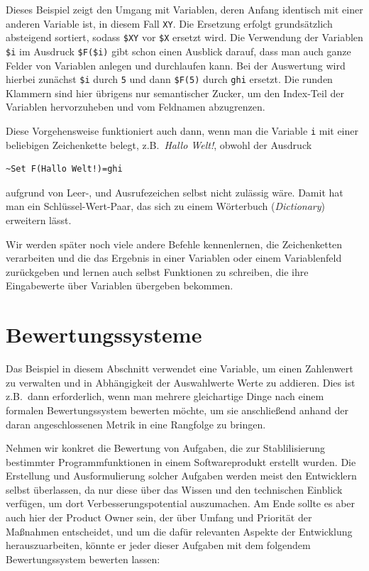 Dieses Beispiel zeigt den Umgang mit Variablen, deren Anfang identisch mit einer anderen Variable ist, in diesem Fall \verb|XY|. Die Ersetzung erfolgt grundsätzlich absteigend sortiert, sodass \verb|$XY| vor \verb|$X| ersetzt wird. Die Verwendung der Variablen \verb|$i| im Ausdruck \verb|$F($i)| gibt schon einen Ausblick darauf, dass man auch ganze Felder von Variablen anlegen und durchlaufen kann. Bei der Auswertung wird hierbei zunächst \verb|$i| durch \verb|5| und dann \verb|$F(5)| durch \verb|ghi| ersetzt. Die runden Klammern sind hier übrigens nur semantischer Zucker, um den Index-Teil der Variablen hervorzuheben und vom Feldnamen abzugrenzen. 

Diese Vorgehensweise funktioniert auch dann, wenn man die Variable \verb|i| mit einer beliebigen Zeichenkette belegt, z.B.\ \emph{Hallo Welt!}, obwohl der Ausdruck 
\begin{verbatim}
~Set F(Hallo Welt!)=ghi
\end{verbatim}
aufgrund von Leer-, und Ausrufezeichen selbst nicht zulässig wäre. Damit hat man ein Schlüssel-Wert-Paar, das sich zu einem Wörterbuch (\emph{Dictionary}) erweitern lässt.

Wir werden später noch viele andere Befehle kennenlernen, die Zeichenketten verarbeiten und die das Ergebnis in einer Variablen oder einem Variablenfeld zurückgeben und lernen auch selbst Funktionen zu schreiben, die ihre Eingabewerte über Variablen übergeben bekommen. 

\section{Bewertungssysteme}\label{BewSysteme}
Das Beispiel in diesem Abschnitt verwendet eine Variable, um einen Zahlenwert zu verwalten und in Abhängigkeit der Auswahlwerte Werte zu addieren. Dies ist z.B.\ dann erforderlich, wenn man mehrere gleichartige Dinge nach einem formalen Bewertungssystem bewerten möchte, um sie anschließend anhand der daran angeschlossenen Metrik in eine Rangfolge zu bringen. 

Nehmen wir konkret die Bewertung von Aufgaben, die zur Stablilisierung bestimmter Programmfunktionen in einem Softwareprodukt erstellt wurden. Die Erstellung und Ausformulierung solcher Aufgaben werden meist den Entwicklern selbst überlassen, da nur diese über das Wissen und den technischen Einblick verfügen, um dort Verbesserungspotential auszumachen. Am Ende sollte es aber auch hier der Product Owner sein, der über Umfang und Priorität der Maßnahmen entscheidet, und um die dafür relevanten Aspekte der Entwicklung herauszuarbeiten, könnte er jeder dieser Aufgaben mit dem folgendem Bewertungssystem bewerten lassen:

